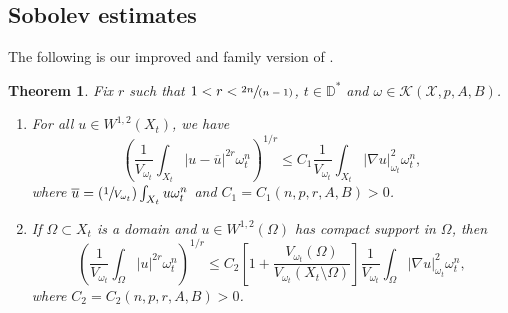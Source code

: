 \documentclass[11pt]{article}
\numberwithin{equation}{section}
\newcommand{\Psfrac}[2]{(\sfrac{#1}{#2})}
\newcommand{\spfrac}[2]{\sfrac{#1}{(#2)}}
\newtheorem{theorem}{Theorem}[section]
\theoremstyle{definition}
\newcommand{\D}{\mathbb D}
\begin{document}
\subsection{Sobolev estimates} \label{sec:sobolev}

The following is our improved and family version of \cite[Th.\,2.1 \& Lem.\,6.2]{GPSS23}.

\begin{theorem} \label{thm:sobolev}
Fix $r$ such that $1<r< \spfrac{2n}{n-1}$, $t \in \D^*$ and $\omega \in {\mathcal K}(\mathcal{X},p,A,B)$.
\begin{enumerate}
\item
For all $u\in W^{1,2}(X_t)$, we have
\[
\left(\frac{1}{V_{\omega_t}} \int_{X_t} |u-\overline{u}|^{2r}\omega_t^n\right)^{1/r}
\leq C_1\frac{1}{V_{\omega_t}} \int_{X_t} |\nabla u|^2_{\omega_t} \omega_t^n,
\]
where $\overline u= \Psfrac{1}{V_{\omega_t}}\int_{X_t} u \omega_t^n$ and $C_1=C_1(n,p,r,A,B)>0$.

\item
If $\Omega \subset X_t$ is a domain and $u\in W^{1,2}(\Omega)$
has compact support in $\Omega$, then
\[
\left( \frac{1}{V_{\omega_t}} \int_{\Omega} |u|^{2r}\omega_t^n \right)^{1/r}
\leq C_2 \left[1+ \frac{V_{\omega_t}(\Omega)}{V_{\omega_t}(X_t \setminus \Omega)} \right]
\frac{1}{V_{\omega_t}} \int_{\Omega} |\nabla u|^2_{\omega_t} \omega_t^n,
\]
where $C_2=C_2(n,p,r,A,B)>0$.
\end{enumerate}
\end{theorem}
\end{document}
